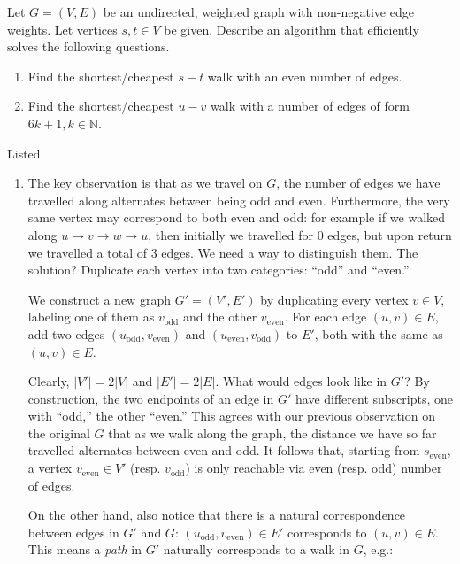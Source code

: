   \begin{exercise}
    Let $G=(V,E)$ be an undirected, weighted graph with non-negative edge weights. Let vertices $s,t\in V$ be given. Describe an algorithm that efficiently solves the following questions.
    \begin{enumerate}
      \item Find the shortest/cheapest $s-t$ walk with an even number of edges.
      \item Find the shortest/cheapest $u-v$ walk with a number of edges of form $6k+1, k\in \mathbb{N}$. 
    \end{enumerate}
  \end{exercise}
  \begin{solution}
    Listed. 
    \begin{enumerate}
      \item The key observation is that as we travel on $G$, the number of edges we have travelled along alternates between being odd and even. Furthermore, the very same vertex may correspond to both even and odd: for example if we walked along $u\to v\to w\to u$, then initially we travelled for $0$ edges, but upon return we travelled a total of $3$ edges. We need a way to distinguish them. The solution? Duplicate each vertex into two categories: ``odd'' and ``even.''

      We construct a new graph $G' = (V', E')$ by duplicating every vertex $v\in V$, labeling one of them as $v_{\text{odd}}$ and the other $v_{\text{even}}$. For each edge $(u,v)\in E$, add two edges $(u_{\text{odd}}, v_\text{even})$ and $(u_{\text{even}}, v_{\text{odd}})$ to $E'$, both with the same as $(u,v)\in E$. 

      Clearly, $\lvert V'\rvert  = 2 \lvert V\rvert $ and $\lvert E'\rvert  = 2 \lvert E\rvert $. What would edges look like in $G'$? By construction, the two endpoints of an edge in $G'$ have different subscripts, one with ``odd,'' the other ``even.'' This agrees with our previous observation on the original $G$ that as we walk along the graph, the distance we have so far travelled alternates between even and odd. It follows that, starting from $s_\text{even}$, a vertex $v_\text{even}\in V'$ (resp. $v_\text{odd}$) is only reachable via even (resp. odd) number of edges. 

      On the other hand, also notice that there is a natural correspondence between edges in $G'$ and $G$: $(u_\text{odd}, v_\text{even})\in E'$ corresponds to $(u,v)\in E$. This means a \textit{path} in $G'$ naturally corresponds to a walk in $G$, e.g.:


\end{enumerate}
\end{solution}
